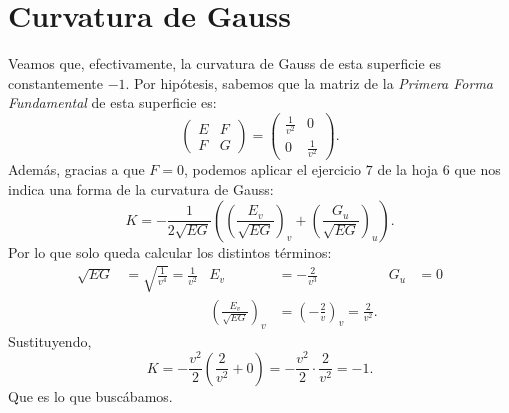 \section{Curvatura de Gauss}
Veamos que, efectivamente, la curvatura de Gauss de esta superficie es
constantemente $-1$. Por hipótesis, sabemos que la matriz de la \textit{Primera
Forma Fundamental} de esta superficie es:
\[
    \begin{pmatrix} E & F\\ F & G \end{pmatrix} = \begin{pmatrix} \frac{1}{v^2} & 0\\
    0 & \frac{1}{v^2}\end{pmatrix}.
\]
Además, gracias a que $F = 0$, podemos aplicar el ejercicio $7$ de la hoja $6$
que nos indica una forma de la curvatura de Gauss:
\[
K = -\frac{1}{2 \sqrt{EG}}\left( \left( \frac{E_v}{\sqrt{EG}} \right)_v + \left(
\frac{G_u}{\sqrt{EG}}\right)_u \right).
\]
Por lo que solo queda calcular los distintos términos:
\begin{align*}
    \sqrt{EG} &= \sqrt{\frac{1}{v^4}} = \frac{1}{v^2} & E_v &= -\frac{2}{v^3} &
    G_u &= 0\\
        & & \left( \frac{E_v}{\sqrt{EG}} \right)_v &= \left( -\frac{2}{v}
        \right)_v = \frac{2}{v^2}.
\end{align*}
Sustituyendo,
\[
K = -\frac{v^2}{2} \left( \frac{2}{v^2} + 0 \right) = - \frac{v^2}{2} \cdot
\frac{2}{v^2} = -1.
\]
Que es lo que buscábamos.
